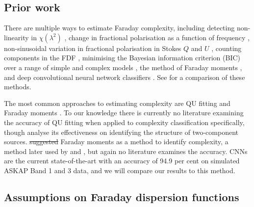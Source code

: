 \documentclass[11pt, a4paper]{book}
\newcommand{\defn}[1]{\emph{#1}}
\providecommand{\DIFaddtex}[1]{{\protect\color{blue}\uwave{#1}}} %
\providecommand{\DIFdeltex}[1]{{\protect\color{red}\sout{#1}}}                      %
\providecommand{\DIFaddbegin}{} %
\providecommand{\DIFaddend}{} %
\providecommand{\DIFdelbegin}{} %
\providecommand{\DIFdelend}{} %
\providecommand{\DIFadd}[1]{\texorpdfstring{\DIFaddtex{#1}}{#1}} %
\providecommand{\DIFdel}[1]{\texorpdfstring{\DIFdeltex{#1}}{}} %
\newcommand{\DIFscaledelfig}{0.5}
\newlength{\DIFdelgraphicswidth} %
\newlength{\DIFdelgraphicsheight} %
\newcommand{\DIFaddincludegraphics}[2][]{{\color{blue}\fbox{\DIFOincludegraphics[#1]{#2}}}} %
\newcommand{\DIFdelincludegraphics}[2][]{%
\sbox{\DIFdelgraphicsbox}{\DIFOincludegraphics[#1]{#2}}%
\settoboxwidth{\DIFdelgraphicswidth}{\DIFdelgraphicsbox} %
\settoboxtotalheight{\DIFdelgraphicsheight}{\DIFdelgraphicsbox} %
\scalebox{\DIFscaledelfig}{%
\parbox[b]{\DIFdelgraphicswidth}{\usebox{\DIFdelgraphicsbox}\\[-\baselineskip] \rule{\DIFdelgraphicswidth}{0em}}\llap{\resizebox{\DIFdelgraphicswidth}{\DIFdelgraphicsheight}{%
\setlength{\unitlength}{\DIFdelgraphicswidth}%
\begin{picture}(1,1)%
\thicklines\linethickness{2pt} %
{\color[rgb]{1,0,0}\put(0,0){\framebox(1,1){}}}%
{\color[rgb]{1,0,0}\put(0,0){\line( 1,1){1}}}%
{\color[rgb]{1,0,0}\put(0,1){\line(1,-1){1}}}%
\end{picture}%
}\hspace*{3pt}}} %
} %
\DeclareRobustCommand{\DIFaddbegin}{\DIFOaddbegin \let\includegraphics\DIFaddincludegraphics} %
\DeclareRobustCommand{\DIFaddend}{\DIFOaddend \let\includegraphics\DIFOincludegraphics} %
\DeclareRobustCommand{\DIFdelbegin}{\DIFOdelbegin \let\includegraphics\DIFdelincludegraphics} %
\DeclareRobustCommand{\DIFdelend}{\DIFOaddend \let\includegraphics\DIFOincludegraphics} %
\begin{document}
  \subsection{Prior work}
  \label{sec:faraday-prior-work}

      There are multiple ways to estimate Faraday complexity, including detecting non-\linebreak{}linearity in $\chi(\lambda^2)$ \citep{goldstein84faraday}, change in fractional polarisation as a function of frequency \citep{farnes14broadband}, non-sinusoidal variation in fractional polarisation in Stokes $Q$ and $U$ \citep{osullivan12agn}, counting components in the FDF \citep{law11faraday}, minimising the Bayesian information criterion (BIC) over a range of simple and complex models \citep[called \defn{QU fitting};][]{osullivan_broad-band_2017}, the method of Faraday moments \citep{anderson_broadband_2015,brown11report}, and deep convolutional neural network classifiers \citep[CNNs;][]{brown_classifying_2018}. See \citet{sun15comparison} for a comparison of these methods.

      The most common approaches to estimating complexity are QU fitting \linebreak\citep[e.g.][]{osullivan_broad-band_2017} and Faraday moments \citep[e.g.][]{anderson_broadband_2015}. To our knowledge there is currently no literature examining the accuracy of QU fitting when applied to complexity classification specifically, though \citet{miyashita19qu} analyse its effectiveness on identifying the structure of two-component sources. \citet{brown11report} \DIFdelbegin \DIFdel{suggested }\DIFdelend \DIFaddbegin \DIFadd{suggests }\DIFaddend Faraday moments as a method to identify complexity, a method later used by \citet{farnes14broadband} and \citet{anderson_broadband_2015}, but again no literature examines the accuracy. CNNs are the current state-of-the-art with an accuracy of 94.9 per cent \citep{brown_classifying_2018} on simulated ASKAP Band 1 and 3 data, and we will compare our results to this method.

  \subsection{Assumptions on Faraday dispersion functions}
  \label{sec:faraday-fdfs}
\end{document}
